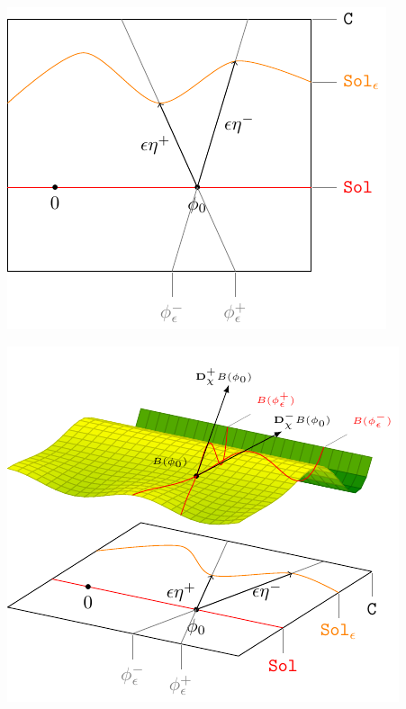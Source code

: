 \documentclass[Main]{subfiles}
\begin{document}
	\includegraphics[width=\textwidth]{Pictures/GeometricPicture2}
				
	\includegraphics[width=\textwidth]{Pictures/GeometricPicture3}
				
\end{document}
